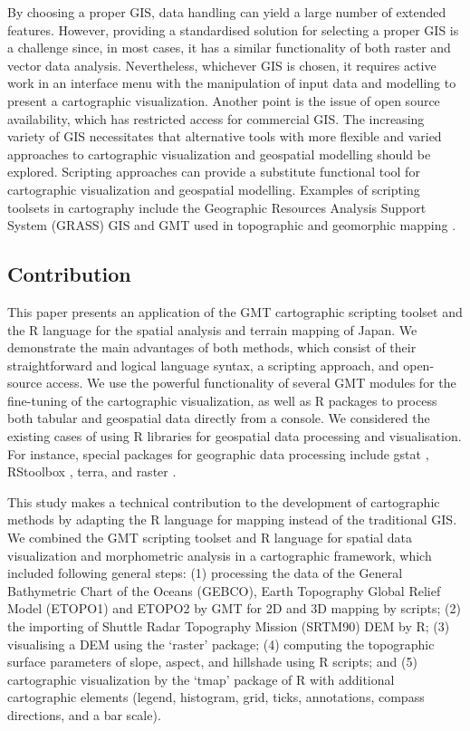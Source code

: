 \documentclass[land,article,accept,pdftex,moreauthors]{Definitions/mdpi}
\begin{document}
By choosing a proper GIS, data handling can yield a large number of extended features. However, providing a standardised solution for selecting a proper GIS is a challenge since, in most cases, it has a similar functionality of both raster and vector data analysis. Nevertheless, whichever GIS is chosen, it requires active work in an interface menu with the manipulation of input data and modelling to present a cartographic visualization. Another point is the issue of open source availability, which has restricted access for commercial GIS. The increasing variety of GIS necessitates that alternative tools with more flexible and varied approaches to cartographic visualization and geospatial modelling should be explored. Scripting approaches can provide a substitute functional tool for cartographic visualization and geospatial modelling. Examples of scripting toolsets in cartography include the Geographic Resources Analysis Support System (GRASS) GIS \cite{Lemenkova202016,Lemenkova202026} and GMT used in topographic and geomorphic mapping \cite{ijgi11090473,geosciences12030140}. 

\subsection{Contribution}

This paper presents an application of the GMT cartographic scripting toolset \cite{Wesseletal2019} and the R language \cite{RCoreTeam} for the spatial analysis and terrain mapping of Japan. We demonstrate the main advantages of both methods, which consist of their straightforward and logical language syntax, a scripting approach, and open-source access. We use the powerful functionality of several GMT modules for the fine-tuning of the cartographic visualization, as well as R packages to process both tabular and geospatial data directly from a console. We considered the existing cases of using R libraries for geospatial data processing and visualisation. For instance, special packages for geographic data processing include gstat \cite{HENGL20081886}, RStoolbox \cite{app122412554}, terra, and raster \cite{jimaging8120317}.

This study makes a technical contribution to the development of cartographic methods by adapting the R language for mapping instead of the traditional GIS. We combined the GMT scripting toolset and R language for spatial data visualization and morphometric analysis in a cartographic framework, which included following general steps: (1) processing the data of the General Bathymetric Chart of the Oceans (GEBCO), Earth Topography Global Relief Model (ETOPO1) and ETOPO2 by GMT for 2D and 3D mapping by scripts; (2) the importing of Shuttle Radar Topography Mission (SRTM90) DEM by R; (3) visualising a DEM using the `raster' package; (4) computing the topographic surface parameters of slope, aspect, and hillshade using R scripts; and (5) cartographic visualization by the `tmap' package of R with additional cartographic elements (legend, histogram, grid, ticks, annotations, compass directions, and a bar scale). %
\end{document}
